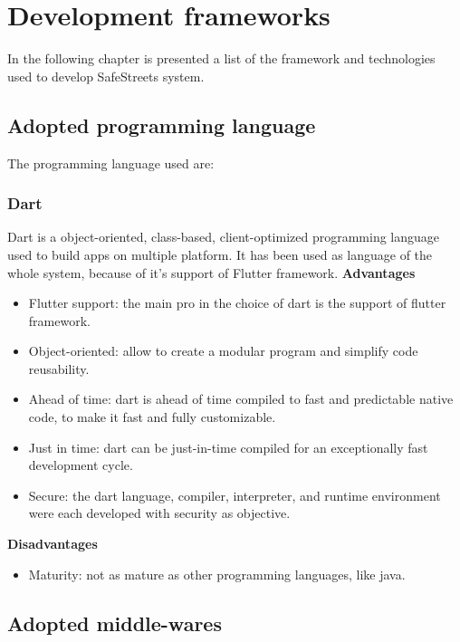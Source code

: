 \documentclass[../ITD.tex]{subfiles}
\begin{document}
    \chapter{Development frameworks}\label{ch: development-frameworks}
    In the following chapter is presented a list of the framework and technologies used to develop SafeStreets system.
    \section{Adopted programming language}\label{sec:adopted-programming-laguage}
    The programming language used are:
    \subsection{Dart}\label{subsec:dart}
    Dart is a object-oriented, class-based, client-optimized programming language used to build apps on multiple platform.
    It has been used as language of the whole system, because of it's support of Flutter framework.
    \newline
    \textbf{Advantages}
    \begin{itemize}
        \item Flutter support: the main pro in the choice of dart is the support of flutter framework.
        \item Object-oriented: allow to create a modular program and simplify code reusability.
        \item Ahead of time: dart is ahead of time compiled to fast and predictable native code, to make it fast and fully customizable.
        \item Just in time: dart can be just-in-time compiled for an exceptionally fast development cycle.
        \item Secure: the dart language, compiler, interpreter, and runtime environment were each developed with security as objective.
    \end{itemize}

    \textbf{Disadvantages}
    \begin{itemize}
        \item Maturity: not as mature as other programming languages, like java.
    \end{itemize}

    \section{Adopted middle-wares}\label{sec:adopted-middle-wares}
\end{document}
